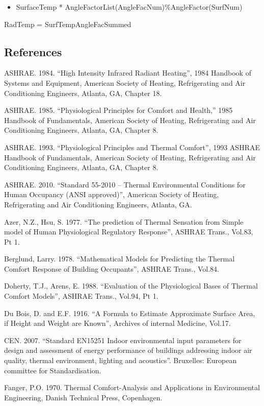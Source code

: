 \begin{itemize}
\tightlist
\item
  SurfaceTemp * AngleFactorList(AngleFacNum)\%AngleFactor(SurfNum)
\end{itemize}

RadTemp = SurfTempAngleFacSummed

\subsection{References}\label{references-1-012}

ASHRAE. 1984. ``High Intensity Infrared Radiant Heating'', 1984 Handbook of Systems and Equipment, American Society of Heating, Refrigerating and Air Conditioning Engineers, Atlanta, GA, Chapter 18.

ASHRAE. 1985. ``Physiological Principles for Comfort and Health,'' 1985 Handbook of Fundamentals, American Society of Heating, Refrigerating and Air Conditioning Engineers, Atlanta, GA, Chapter 8.

ASHRAE. 1993. ``Physiological Principles and Thermal Comfort'', 1993 ASHRAE Handbook of Fundamentals, American Society of Heating, Refrigerating and Air Conditioning Engineers, Atlanta, GA, Chapter 8.

ASHRAE. 2010. ``Standard 55-2010 -- Thermal Environmental Conditions for Human Occupancy (ANSI approved)'', American Society of Heating, Refrigerating and Air Conditioning Engineers, Atlanta, GA.

Azer, N.Z., Hsu, S. 1977. ``The prediction of Thermal Sensation from Simple model of Human Physiological Regulatory Response'', ASHRAE Trans., Vol.83, Pt 1.

Berglund, Larry. 1978. ``Mathematical Models for Predicting the Thermal Comfort Response of Building Occupants'', ASHRAE Trans., Vol.84.

Doherty, T.J., Arens, E. 1988. ``Evaluation of the Physiological Bases of Thermal Comfort Models'', ASHRAE Trans., Vol.94, Pt 1.

Du Bois, D. and E.F. 1916. ``A Formula to Estimate Approximate Surface Area, if Height and Weight are Known'', Archives of internal Medicine, Vol.17.

CEN. 2007. ``Standard EN15251 Indoor environmental input parameters for design and assessment of energy performance of buildings addressing indoor air quality, thermal environment, lighting and acoustics''. Bruxelles: European committee for Standardisation.

Fanger, P.O. 1970. Thermal Comfort-Analysis and Applications in Environmental Engineering, Danish Technical Press, Copenhagen.

